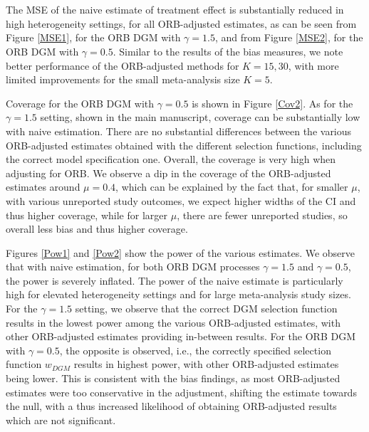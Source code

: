 \documentclass{article}\usepackage[]{graphicx}\usepackage[]{xcolor}
\providecommand{\DIFaddtex}[1]{{\protect\color{blue}\uwave{#1}}} %
\providecommand{\DIFaddbegin}{} %
\providecommand{\DIFaddend}{} %
\providecommand{\DIFadd}[1]{\texorpdfstring{\DIFaddtex{#1}}{#1}} %
\newcommand{\DIFaddincludegraphics}[2][]{{\color{blue}\fbox{\DIFOincludegraphics[#1]{#2}}}} %
\DeclareRobustCommand{\DIFaddbegin}{\DIFOaddbegin \let\includegraphics\DIFaddincludegraphics} %
\DeclareRobustCommand{\DIFaddend}{\DIFOaddend \let\includegraphics\DIFOincludegraphics} %
\begin{document}
\DIFaddbegin 

\section{\DIFadd{Additional Measures of Primary Simulation (MNAR)}}

\DIFaddend The MSE of the naive estimate of treatment effect is substantially reduced in high heterogeneity settings, for all ORB-adjusted estimates, as can be seen from Figure \ref{MSE1}, for the ORB DGM with $\gamma=1.5$, and from Figure \ref{MSE2}, for the ORB DGM with $\gamma=0.5$. Similar to the results of the bias measures, we note better performance of the ORB-adjusted methods for $K=15,30$, with more limited improvements for the small meta-analysis size $K=5$. 

\DIFaddbegin \bigskip

\DIFaddend Coverage for the ORB DGM with $\gamma=0.5$ is shown in Figure \ref{Cov2}. As for the $\gamma=1.5$ setting, shown in the main manuscript, coverage can be substantially low with naive estimation. There are no substantial differences between the various ORB-adjusted estimates obtained with the different selection functions, including the correct model specification one. Overall, the coverage is very high when adjusting for ORB. We observe a dip in the coverage of the ORB-adjusted estimates around $\mu=0.4$, which can be explained by the fact that, for smaller $\mu$, with various unreported study outcomes, we expect higher widths of the CI and thus higher coverage, while for larger $\mu$, there are fewer unreported studies, so overall less bias and thus higher coverage.

\DIFaddbegin \bigskip

\DIFaddend %
Figures \ref{Pow1} and \ref{Pow2} show the power of the various estimates. We observe that with naive estimation, for both ORB DGM processes $\gamma=1.5$ and $\gamma=0.5$, the power is severely inflated. The power of the naive estimate is particularly high for elevated heterogeneity settings and for large meta-analysis study sizes. For the $\gamma=1.5$ setting, we observe that the correct DGM selection function results in the lowest power among the various ORB-adjusted estimates, with other ORB-adjusted estimates providing in-between results. For the ORB DGM with $\gamma=0.5$, the opposite is observed, i.e., the correctly specified selection function $w_{DGM}$ results in highest power, with other ORB-adjusted estimates being lower. This is consistent with the bias findings, as most ORB-adjusted estimates were too conservative in the adjustment, shifting the estimate towards the null, with a thus increased likelihood of obtaining ORB-adjusted results which are not significant.
\end{document}
